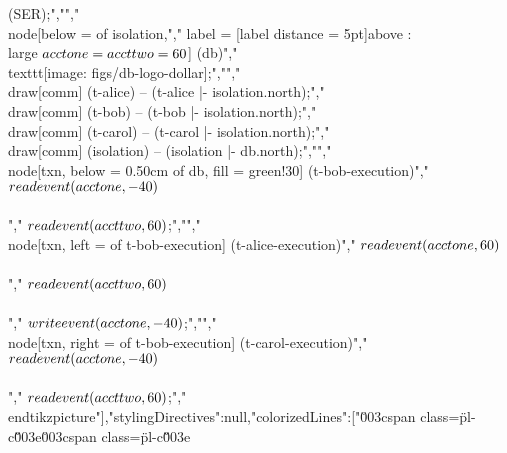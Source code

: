 {{(SER)}};","","  \\node[below = of isolation,","    label = {[label distance = 5pt]above : {\\large $\\acctone = \\accttwo = 60$}}] (db)","    {\\texttt{[image: figs/db-logo-dollar]}};","","  \\draw[comm] (t-alice) -- (t-alice |- isolation.north);","  \\draw[comm] (t-bob) -- (t-bob |- isolation.north);","  \\draw[comm] (t-carol) -- (t-carol |- isolation.north);","  \\draw[comm] (isolation) -- (isolation |- db.north);","","  \\node[txn, below = 0.50cm of db, fill = green!30] (t-bob-execution)","    {$\\readevent(\\acctone, -40)$ \\\\[2pt]","     $\\readevent(\\accttwo, 60)$};","","  \\node[txn, left = of t-bob-execution] (t-alice-execution)","    {$\\readevent(\\acctone, 60)$ \\\\[2pt]","     $\\readevent(\\accttwo, 60)$ \\\\[2pt]","     $\\writeevent(\\acctone, -40)$};","","  \\node[txn, right = of t-bob-execution] (t-carol-execution)","    {$\\readevent(\\acctone, -40)$ \\\\[2pt]","     $\\readevent(\\accttwo, 60)$};","\\end{tikzpicture}"],"stylingDirectives":null,"colorizedLines":["\u003cspan class=\"pl-c\"\u003e\u003cspan class=\"pl-c\"\u003e%

